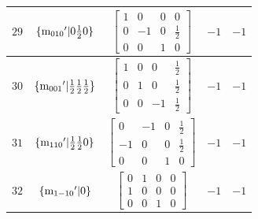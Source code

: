 \documentclass[fleqn,8pt]{jsarticle}
\begin{document}
\begin{longtable}{ccccc}
$ 29 $ & $ \{{\rm m}_{010}{}'|0 \frac{1}{2} 0\} $ & $ \begin{bmatrix} 1 & 0 & 0 & 0 \\ 0 & -1 & 0 & \frac{1}{2} \\ 0 & 0 & 1 & 0 \end{bmatrix} $ & $ -1 $ & $ -1 $ \\ \hline
$ 30 $ & $ \{{\rm m}_{001}{}'|\frac{1}{2} \frac{1}{2} \frac{1}{2}\} $ & $ \begin{bmatrix} 1 & 0 & 0 & \frac{1}{2} \\ 0 & 1 & 0 & \frac{1}{2} \\ 0 & 0 & -1 & \frac{1}{2} \end{bmatrix} $ & $ -1 $ & $ -1 $ \\ \hline
$ 31 $ & $ \{{\rm m}_{110}{}'|\frac{1}{2} \frac{1}{2} 0\} $ & $ \begin{bmatrix} 0 & -1 & 0 & \frac{1}{2} \\ -1 & 0 & 0 & \frac{1}{2} \\ 0 & 0 & 1 & 0 \end{bmatrix} $ & $ -1 $ & $ -1 $ \\ \hline
$ 32 $ & $ \{{\rm m}_{1-10}{}'|0\} $ & $ \begin{bmatrix} 0 & 1 & 0 & 0 \\ 1 & 0 & 0 & 0 \\ 0 & 0 & 1 & 0 \end{bmatrix} $ & $ -1 $ & $ -1 $ \\
\end{longtable}
\end{document}
